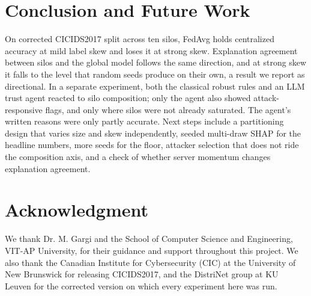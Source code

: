 \documentclass[conference]{IEEEtran}
\newif\iffullversion
\begin{document}
\section{Conclusion and Future Work}
On corrected CICIDS2017 split across ten silos, FedAvg holds centralized accuracy at
mild label skew and loses it at strong skew. Explanation agreement between silos and the
global model follows the same direction, and at strong skew it falls to the level that
random seeds produce on their own, a result we report as directional. In a separate
experiment, both the classical robust rules and an LLM trust agent reacted to silo
composition; only the agent also showed attack-responsive flags, and only where silos
were not already saturated. The agent's written reasons were only partly accurate. Next steps include a partitioning design that varies size and skew
independently, seeded multi-draw SHAP for the headline numbers, more seeds for the floor,
attacker selection that does not ride the composition axis, and a check of whether
server momentum changes explanation agreement.

\section*{Acknowledgment}
We thank Dr. M. Gargi and the School of Computer Science and Engineering,
VIT-AP University, for their guidance and support throughout this project. We also
thank the Canadian Institute for Cybersecurity (CIC) at the University of New Brunswick
for releasing CICIDS2017, and the DistriNet group at KU Leuven for the corrected
version on which every experiment here was run.




\iffullversion
\clearpage
\appendices

\fi
\end{document}
